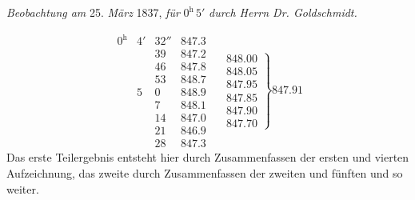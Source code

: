 \begin{center}\textit{Beobachtung am} 25. \textit{März} 1837, \textit{für} $0^{\mathrm h}\,5'$ \textit{durch Herrn Dr. Goldschmidt.}\end{center}
\[
\begin{array}{rrr|r|}
0^{\mathrm h}&4'&32''&847.3\\
&&39&847.2\\
&&46&847.8\\
&&53&848.7\\
&5&0&848.9\\
&&7&848.1\\
&&14&847.0\\
&&21&846.9\\
&&28&847.3
\end{array}\quad
\left.\begin{array}{r}848.00\\848.05\\847.95\\847.85\\847.90\\847.70\end{array}\right\}847.91
\]
Das erste Teilergebnis entsteht hier durch Zusammenfassen der ersten und vierten Aufzeichnung, das zweite durch Zusammenfassen der zweiten und fünften und so weiter.

